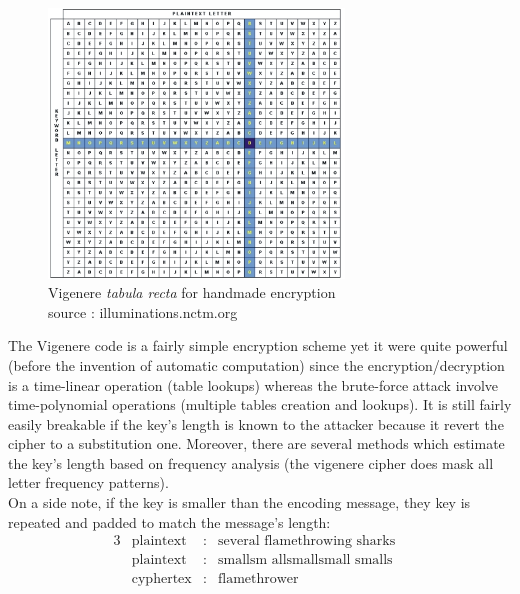 \begin{figure}[ht!]
    \centering
        \includegraphics[width=0.7\textwidth]{images/vigenere}
	\caption{Vigenere \emph{tabula recta} for handmade encryption\\ source : illuminations.nctm.org}
	\label{fig:TabulaRecta}
\end{figure}

The Vigenere code is a fairly simple encryption scheme yet it were quite powerful (before the invention of automatic computation) since the encryption/decryption is a time-linear operation (table lookups) whereas the brute-force attack involve time-polynomial operations (multiple tables creation and lookups). It is still fairly easily breakable if the key's length is known to the attacker because it revert the cipher to a substitution one. Moreover, there are several methods which estimate the key's length based on frequency analysis (the vigenere cipher does mask all letter frequency patterns).\\





On a side note, if the key is smaller than the encoding message, they key is repeated and padded to match the message's length:
\begin{alignat*}{3}
    &\text{plaintext}   & : & \text{several flamethrowing sharks}&  \\
    &\text{plaintext}   & : & \text{smallsm allsmallsmall smalls}&  \\
    &\text{cyphertex}   & : & \text{flamethrower}&  \\ 
\end{alignat*}



